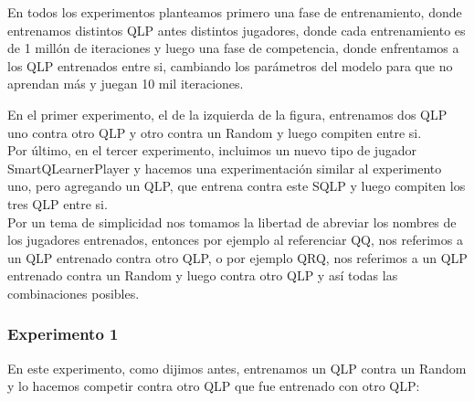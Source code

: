 \documentclass[10pt, a4paper]{article}
\begin{document}
En todos los experimentos planteamos primero una fase de entrenamiento, donde entrenamos distintos QLP antes distintos jugadores, donde cada entrenamiento es de 1 millón de iteraciones y luego una fase de competencia, donde enfrentamos a los QLP entrenados entre si, cambiando los parámetros del modelo para que no aprendan más y juegan 10 mil iteraciones.

En el primer experimento, el de la izquierda de la figura, entrenamos dos QLP uno contra otro QLP y otro contra un Random y luego compiten entre si.\\


Por último, en el tercer experimento, incluimos un nuevo tipo de jugador SmartQLearnerPlayer y hacemos una experimentación similar al experimento uno, pero agregando un QLP, que entrena contra este SQLP y luego compiten los tres QLP entre si.\\

Por un tema de simplicidad nos tomamos la libertad de abreviar los nombres de los jugadores entrenados, entonces por ejemplo al referenciar QQ, nos referimos a un QLP entrenado contra otro QLP, o por ejemplo QRQ, nos referimos a un QLP entrenado contra un Random y luego contra otro QLP y así todas las combinaciones posibles.


\subsubsection{Experimento 1}


En este experimento, como dijimos antes, entrenamos un QLP contra un Random y lo hacemos competir contra otro QLP que fue entrenado con otro QLP:
\end{document}

